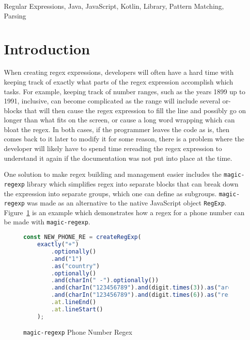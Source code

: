 \documentclass[conference]{IEEEtran}
\begin{document}
\begin{IEEEkeywords}
    Regular Expressions, Java, JavaScript, Kotlin, Library, Pattern Matching, Parsing
\end{IEEEkeywords}

\section{Introduction}
When creating regex expressions, developers will often have a hard time with keeping track of exactly
what parts of the regex expression accomplish which tasks. For example, keeping track of number ranges,
such as the years 1899 up to 1991, inclusive, can become complicated as the range will include several or-blocks that
will then cause the regex expression to fill the line and possibly go on longer than what fits on the screen,
or cause a long word wrapping which can bloat the regex.
In both cases, if the programmer leaves the code as is, then comes back to it later to modify it for some reason,
there is a problem where the developer will likely have to spend time rereading the regex expression to understand
it again if the documentation was not put into place at the time.

One solution to make regex building and management easier includes the \texttt{magic-regexp} library
which simplifies regex into separate blocks that can break down the expression into separate
groups, which one can define as subgroups.\cite{magic-regexp}
\texttt{magic-regexp} was made as an alternative to the native JavaScript object \texttt{RegExp}.
Figure~\ref{fig:magic-regexp-phonenum-regex} is an example which demonstrates how a regex for a phone number can be made with
\texttt{magic-regexp}. \cite{omereshone2023}

\vfill\eject

\begin{figure}[htbp]
    \centering
    \label{fig:magic-regexp-phonenum-regex}
    \begin{lstlisting}[language=JavaScript]
const NEW_PHONE_RE = createRegExp(
    exactly("+")
        .optionally()
        .and("1")
        .as("country")
        .optionally()
        .and(charIn(" -").optionally())
        .and(charIn("123456789").and(digit.times(3)).as("area"))
        .and(charIn("123456789").and(digit.times(6)).as("rest"))
        .at.lineEnd()
        .at.lineStart()
    );
    \end{lstlisting}
    \caption{\texttt{magic-regexp} Phone Number Regex}
\end{figure}
\end{document}
